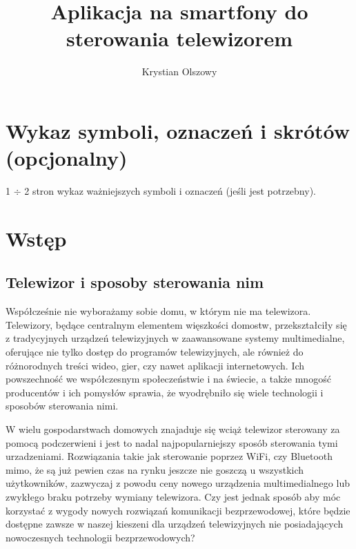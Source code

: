 \documentclass[12pt,twoside]{article}
\author{Krystian Olszowy}
\title{Aplikacja na smartfony do sterowania telewizorem}
\begin{document}
\maketitle

\blankpage

\tableofcontents

\clearpage
\blankpage


\section*{Wykaz symboli, oznaczeń i skrótów (opcjonalny)}
%

1 $\div$ 2 stron wykaz ważniejszych symboli i oznaczeń (jeśli jest potrzebny).
\clearpage

\section{Wstęp}
\subsection{Telewizor i sposoby sterowania nim}
{Współcześnie nie wyborażamy sobie domu, w którym nie ma telewizora. Telewizory, będące 
centralnym elementem więszkości domostw, przekształciły się z tradycyjnych urządzeń 
telewizyjnych w zaawansowane systemy multimedialne, oferujące nie tylko dostęp do programów telewizyjnych,
ale również do różnorodnych treści wideo, gier, czy nawet aplikacji internetowych. 
Ich powszechność we współczesnym społeczeństwie i na świecie, a także mnogość producentów i ich pomysłów 
sprawia, że wyodrębniło się wiele technologii i sposobów sterowania nimi.

W wielu gospodarstwach domowych znajaduje się wciąż telewizor sterowany za pomocą podczerwieni i jest
 to nadal najpopularniejszy sposób sterowania tymi urzadzeniami. Rozwiązania takie jak sterowanie poprzez WiFi, czy Bluetooth
 mimo, że są już pewien czas na rynku jeszcze nie goszczą u wszystkich użytkowników, zazwyczaj z powodu ceny
 nowego urządzenia multimedialnego lub zwykłego braku potrzeby wymiany telewizora. Czy jest jednak sposób aby
móc korzystać z wygody nowych rozwiązań komunikacji bezprzewodowej, które będzie dostępne zawsze w naszej kieszeni 
dla urządzeń telewizyjnych nie posiadających nowoczesnych technologii bezprzewodowych?
}
\end{document}
